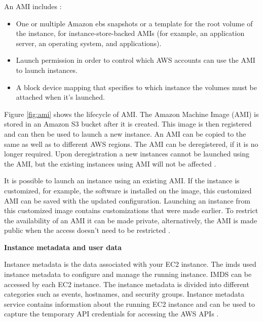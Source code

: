 \par An AMI includes \cite{32}:
\begin{itemize}
    \item One or multiple Amazon \gls{ebs} snapshots or a
    template for the root volume of the instance, for instance-store-backed AMIs (for example, an application server, an operating system, and applications).
\end{itemize}
\begin{itemize}
    \item Launch permission in order to control which AWS accounts can use the AMI to launch instances.
\end{itemize}
\begin{itemize}
    \item A block device mapping that specifies to which instance the volumes must be attached when it’s launched.
\end{itemize}



\par Figure \ref{fig:ami} shows the lifecycle of AMI. The
Amazon Machine Image (AMI) is stored in an Amazon S3
bucket after it is created. This image is then registered and can then be used to launch a new instance. An AMI can be
copied to the same as well as to different AWS regions.
The AMI can be deregistered, if it is no longer required.
Upon deregistration a new instances cannot be launched
using the AMI, but the existing instances using AMI will
not be affected \cite{32}.

\par It is possible to launch an instance using an existing AMI. If the instance is customized, for example, the
software is installed on the image, this customized AMI can be saved with the updated configuration. Launching an
instance from this customized image contains customizations that were made earlier. To restrict the availability of
an AMI it can be made private, alternatively, the AMI is
made public when the access doesn’t need to be restricted \cite{33}.


\hfill \break

\textbf{Instance metadata and user data}
\par Instance metadata is the data associated with your EC2 instance.
The \gls{imds} used instance metadata to configure and
manage
the
running instance.
IMDS can be accessed by each EC2 instance.
The instance metadata is divided into different categories such as events, hostnames, and security
groups. Instance metadata service contains information
about the running EC2 instance and can be used to capture the temporary API credentials for accessing the AWS APIs \cite{34}.

